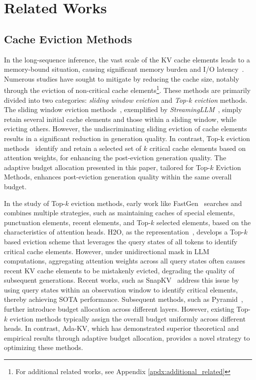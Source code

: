 \section{Related Works}

\subsection{Cache Eviction Methods}

In the long-sequence inference, the vast scale of the KV cache elements leads to a memory-bound situation, causing significant memory burden and I/O latency~\cite{wang2023catalyst}.
Numerous studies have sought to mitigate by reducing the cache size, notably through the eviction of non-critical cache elements\footnote{For additional related works, see Appendix \ref{apdx:additional_related}}.
These  methods are primarily divided into two categories: \textit{sliding window eviction} and \textit{Top-k eviction} methods.
The sliding window eviction methods~\cite{beltagy2020longformer,han2024lminfinitezeroshotextremelength,SLM}, exemplified by \textit{StreamingLLM}~\cite{SLM}, simply retain several initial cache elements and those within a sliding window, while evicting others. However, the undiscriminating sliding eviction of cache elements results in a significant reduction in generation quality.
In contrast, Top-k eviction methods~\cite{FastGen,liu2024scissorhands,ren2024efficacy,H2o,PyramidInfer,PyramidKV,SnapKV} identify and retain a selected set of $k$ critical cache elements based on attention weights, for enhancing the post-eviction generation quality.
The adaptive budget allocation presented in this paper, tailored for Top-$k$ Eviction Methods, enhances post-eviction generation quality within the same overall budget.
	

In the study of Top-$k$ eviction methods, early work like FastGen~\cite{FastGen} searches and combines multiple strategies, such as maintaining caches of special elements, punctuation elements, recent elements, and Top-$k$ selected elements, based on the characteristics of attention heads.
H2O, as the representation~\cite{H2o,liu2024scissorhands,ren2024efficacy}, develops a Top-$k$ based eviction scheme that leverages the query states of all tokens to identify critical cache elements.
However, under unidirectional mask in LLM computations, aggregating attention weights across all query states often causes recent KV cache elements to be mistakenly evicted, degrading the quality of subsequent generations. 
Recent works, such as SnapKV~\cite{SnapKV} address this issue by using query states within an observation window to identify critical elements, thereby achieving SOTA performance. Subsequent methods, such as Pyramid~\cite{PyramidInfer,PyramidKV}, further introduce budget allocation across different layers.
However, existing Top-$k$ eviction methods typically assign the overall budget uniformly across different heads.
In contrast, Ada-KV, which has demonstrated superior theoretical and empirical results through adaptive budget allocation, provides a novel strategy to optimizing these methods.

